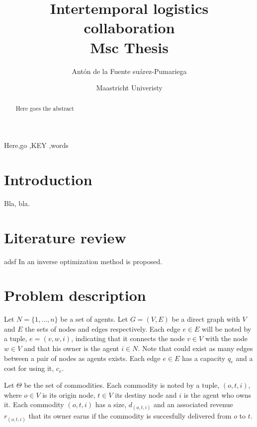 \documentclass[review]{elsarticle}
\begin{document}
\begin{frontmatter}

\title{Intertemporal logistics collaboration \\[5pt]
                \normalsize{Msc Thesis}}

\author{Antón de la Fuente suárez-Pumariega}
\address{a.delafuentesuarez-pumariega@student.maastrichtuniverisry.nl }

\author{Maastricht Univeristy}



\begin{abstract}
Here goes the abstract
\end{abstract}

\begin{keyword}
Here\sep go \sep KEY \sep words
\end{keyword}

\end{frontmatter}


\section{Introduction}

Bla, bla.

\section{Literature review}
adsf
In \cite{Agarwal2008} an inverse optimization method is proposed.

\section{Problem description}

Let $N=\{1,...,n\}$ be a set of agents. Let $G=(V,E)$ be a direct graph with $V$ and $E$ the sets
of nodes and edges respectively. Each edge $e \in E$ will be noted by a tuple, $e=(v,w,i)$, indicating that it 
connects the node $v\in V$ with the node $w \in V$ and that his owner is the agent $i\in N$. Note that could exist as
many edges between a pair of nodes as agents exists. Each edge $e \in E$ has a capacity $q_e$ and a cost for using it, $c_e$.

Let $\Theta$ be the set of commodities. Each commodity is noted by a tuple, $(o,t,i)$, where $o\in V$ is its origin
node, $t\in V$ its destiny node and $i$ is the agent who owns it. Each commodity $(o,t,i)$ has a size, $d_{(o,t,i)}$
and an associated revenue $r_{(o,t,i)}$ that its owner earns if the commodity is succesfully delivered from $o$ to $t$.
\end{document}
